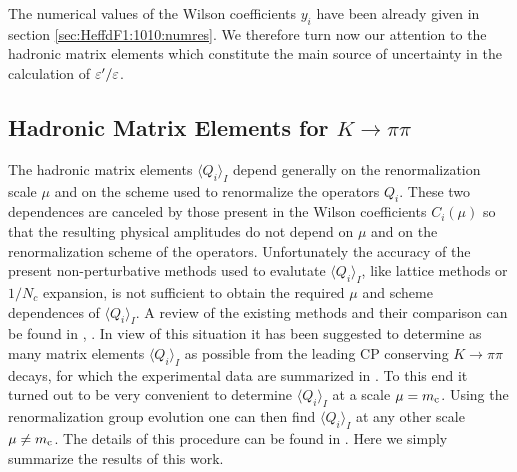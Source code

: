 The numerical values of the Wilson coefficients $y_i$ have been already given
in section \ref{sec:HeffdF1:1010:numres}. We therefore turn now our
attention to the hadronic matrix elements  which
constitute the main source of uncertainty in the calculation of
$\varepsilon'/\varepsilon$.

\subsection{Hadronic Matrix Elements for $K \to \pi\pi$}
           \label{subsec:matelKpp}
The hadronic matrix elements $\langle Q_i \rangle_I$ depend generally
on the renormalization scale $\mu$ and on the scheme used to
renormalize the operators $Q_i$. These two dependences are canceled by
those present in the Wilson coefficients $C_i(\mu)$ so that the
resulting physical amplitudes do not depend on $\mu$ and on the
renormalization scheme of the operators.  Unfortunately the accuracy of
the present non-perturbative methods used to evalutate $\langle Q_i
\rangle_I$, like lattice methods or $1/N_c$ expansion, is not
sufficient to obtain the required $\mu$ and scheme dependences of
$\langle Q_i \rangle_I$. A review of the existing methods and their
comparison can be found in \cite{burasetal:92d}, \cite{ciuchini:95}.
In view of this situation it has been suggested \cite{burasetal:92d} to
determine as many matrix elements $\langle Q_i \rangle_I$ as possible
from the leading CP conserving $K \to \pi\pi$ decays, for which the
experimental data are summarized in . To this end it
turned out to be very convenient to determine $\langle Q_i \rangle_I$
at a scale $\mu = m_{\rm c}$.  Using the renormalization group evolution one
can then find $\langle Q_i \rangle_I$ at any other scale $\mu \not=
m_{\rm c}$. The details of this procedure can be found in
\cite{burasetal:92d}. Here we simply summarize the results of this
work.

